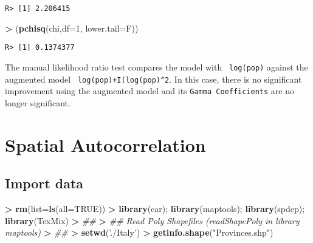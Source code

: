 \documentclass[
]{article}
\newenvironment{Shaded}{\begin{snugshade}}{\end{snugshade}}
\newcommand{\CommentTok}[1]{\textcolor[rgb]{0.56,0.35,0.01}{\textit{#1}}}
\newcommand{\DataTypeTok}[1]{\textcolor[rgb]{0.13,0.29,0.53}{#1}}
\newcommand{\DecValTok}[1]{\textcolor[rgb]{0.00,0.00,0.81}{#1}}
\newcommand{\ErrorTok}[1]{\textcolor[rgb]{0.64,0.00,0.00}{\textbf{#1}}}
\newcommand{\KeywordTok}[1]{\textcolor[rgb]{0.13,0.29,0.53}{\textbf{#1}}}
\newcommand{\NormalTok}[1]{#1}
\newcommand{\OperatorTok}[1]{\textcolor[rgb]{0.81,0.36,0.00}{\textbf{#1}}}
\newcommand{\OtherTok}[1]{\textcolor[rgb]{0.56,0.35,0.01}{#1}}
\newcommand{\StringTok}[1]{\textcolor[rgb]{0.31,0.60,0.02}{#1}}
\begin{document}
\begin{Shaded}
\end{Shaded}

\begin{verbatim}
R> [1] 2.206415
\end{verbatim}

\begin{Shaded}
\begin{Highlighting}[]
\OperatorTok{>}\StringTok{ }\NormalTok{(}\KeywordTok{pchisq}\NormalTok{(chi,}\DataTypeTok{df=}\DecValTok{1}\NormalTok{, }\DataTypeTok{lower.tail=}\NormalTok{F))}
\end{Highlighting}
\end{Shaded}

\begin{verbatim}
R> [1] 0.1374377
\end{verbatim}

The manual likelihood ratio test compares the model with
\texttt{\textbar{}\ log(pop)} against the augmented model
\texttt{\textbar{}\ log(pop)+I(log(pop)\^{}2}. In this case, there is no
significant improvement using the augmented model and its
\texttt{Gamma\ Coefficients} are no longer significant.

\hypertarget{spatial-autocorrelation}{%
\section{Spatial Autocorrelation}\label{spatial-autocorrelation}}

\hypertarget{import-data}{%
\subsection{Import data}\label{import-data}}

\begin{Shaded}
\begin{Highlighting}[]
\OperatorTok{>}\StringTok{ }\KeywordTok{rm}\NormalTok{(}\DataTypeTok{list=}\KeywordTok{ls}\NormalTok{(}\DataTypeTok{all=}\OtherTok{TRUE}\NormalTok{))}
\OperatorTok{>}\StringTok{ }\KeywordTok{library}\NormalTok{(car); }\KeywordTok{library}\NormalTok{(maptools); }\KeywordTok{library}\NormalTok{(spdep); }\KeywordTok{library}\NormalTok{(TexMix)}
\OperatorTok{>}\StringTok{ }\CommentTok{##}
\ErrorTok{>}\StringTok{ }\CommentTok{## Read Poly Shapefiles (readShapePoly in library maptools)}
\ErrorTok{>}\StringTok{ }\CommentTok{##}
\ErrorTok{>}\StringTok{ }\KeywordTok{setwd}\NormalTok{(}\StringTok{'./Italy'}\NormalTok{)}
\OperatorTok{>}\StringTok{ }\KeywordTok{getinfo.shape}\NormalTok{(}\StringTok{"Provinces.shp"}\NormalTok{)}
\end{Highlighting}
\end{Shaded}
\end{document}
